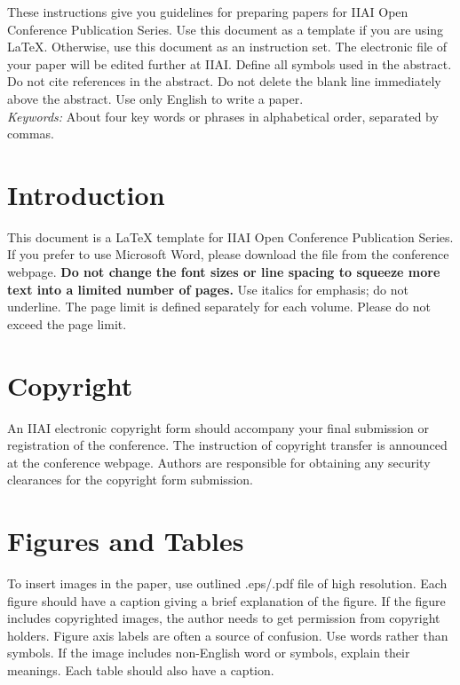 \documentclass[11pt, onecolumn, twoside, a4paper]{article}
\begin{document}
These instructions give you guidelines for preparing papers for IIAI Open Conference Publication Series. Use this document as a template if you are using {\LaTeX}. Otherwise, use this document as an instruction set. The electronic file of your paper will be edited further at IIAI. Define all symbols used in the abstract. Do not cite references in the abstract. Do not delete the blank line immediately above the abstract. Use only English to write a paper.  
%
%
\\[2mm]
{\it Keywords: }About four key words or phrases in alphabetical order, separated by commas.


\section{Introduction}

This document is a {\LaTeX} template for IIAI Open Conference Publication Series. 
If you prefer to use Microsoft Word, please download the file from the conference webpage.
{\bf Do not change the font sizes or line spacing to squeeze more text into a limited number of pages. }
Use italics for emphasis; do not underline.  
The page limit is defined separately for each volume. Please do not exceed the page limit. 

\section{Copyright}
An IIAI electronic copyright form should accompany your final submission or registration of the conference. The instruction of copyright transfer is announced at the conference webpage. Authors are responsible for obtaining any security clearances for the copyright form submission.


\section{Figures and Tables}
To insert images in the paper, use outlined .eps/.pdf file of high resolution.  
Each figure should have a caption giving a brief explanation of the figure. 
If the figure includes copyrighted images, the author needs to get permission from copyright holders. 
Figure axis labels are often a source of confusion. Use words rather than symbols. 
If the image includes non-English word or symbols, explain their meanings. 
Each table should also have a caption. 
\end{document}
